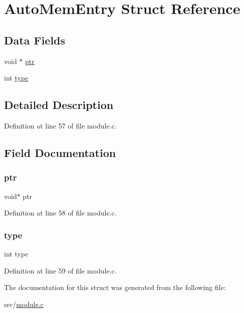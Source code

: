 \hypertarget{struct_auto_mem_entry}{}\section{Auto\+Mem\+Entry Struct Reference}
\label{struct_auto_mem_entry}
\subsection*{Data Fields}
\begin{DoxyCompactItemize}
\item 
void $\ast$ \hyperlink{struct_auto_mem_entry_add9af9569af79ec26dd741fb226b38ba}{ptr}
\item 
int \hyperlink{struct_auto_mem_entry_ac765329451135abec74c45e1897abf26}{type}
\end{DoxyCompactItemize}


\subsection{Detailed Description}


Definition at line 57 of file module.\+c.



\subsection{Field Documentation}
\mbox{\label{struct_auto_mem_entry_add9af9569af79ec26dd741fb226b38ba}} 
\subsubsection{\texorpdfstring{ptr}{ptr}}
{\footnotesize\ttfamily void$\ast$ ptr}



Definition at line 58 of file module.\+c.

\mbox{\label{struct_auto_mem_entry_ac765329451135abec74c45e1897abf26}} 
\subsubsection{\texorpdfstring{type}{type}}
{\footnotesize\ttfamily int type}



Definition at line 59 of file module.\+c.



The documentation for this struct was generated from the following file\+:\begin{DoxyCompactItemize}
\item 
src/\hyperlink{module_8c}{module.\+c}\end{DoxyCompactItemize}
